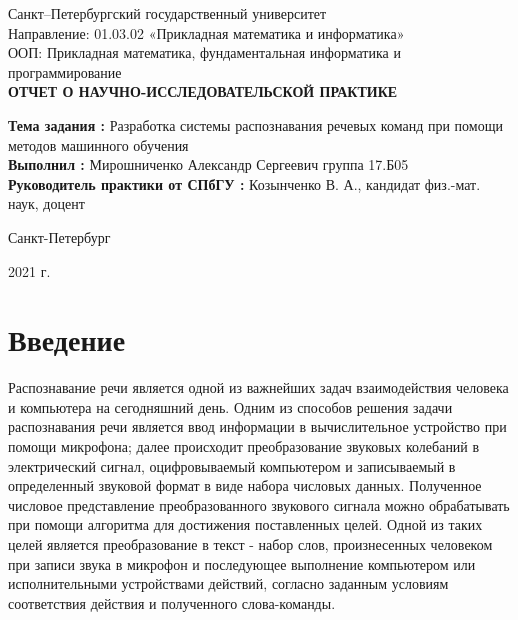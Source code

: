 \documentclass[14pt]{article}
\begin{document}
\begin{titlepage}
\begin{center}
{\Large Санкт--Петербургский государственный университет} \\
Направление: 01.03.02 «Прикладная математика и информатика» \\
ООП: Прикладная математика, фундаментальная информатика и программирование
\vspace{55mm} \\
\textbf{\large ОТЧЕТ О НАУЧНО-ИССЛЕДОВАТЕЛЬСКОЙ ПРАКТИКЕ} \\ [10mm]
{\large }
\begin{flushleft}
{\large \textbf{Тема задания :} Разработка системы распознавания речевых команд при помощи методов машинного обучения} \\ [5mm]
{\large \textbf{Выполнил :} Мирошниченко Александр Сергеевич  группа 17.Б05} \\[5mm]
{\large \textbf{Руководитель практики от СПбГУ :} Козынченко В. А., кандидат физ.-мат. наук, доцент} \\[5mm]
\end{flushleft}
\vfill 
{Санкт-Петербург}
\par{2021 г.}
\end{center}
\end{titlepage}
\addtocounter{page}{1}

\tableofcontents
\newpage

\section*{Введение}
Распознавание речи является одной из важнейших задач взаимодействия человека и компьютера на сегодняшний день. Одним из способов решения задачи распознавания речи является ввод информации в вычислительное устройство при помощи микрофона; далее происходит преобразование звуковых колебаний в электрический сигнал, оцифровываемый компьютером и записываемый в определенный звуковой формат в виде набора числовых данных. Полученное числовое представление преобразованного звукового сигнала можно обрабатывать при помощи алгоритма для достижения поставленных целей. Одной из таких целей является преобразование в текст - набор слов, произнесенных человеком при записи звука в микрофон и последующее выполнение компьютером или исполнительными устройствами действий, согласно заданным условиям соответствия действия и полученного слова-команды. \\
\end{document}

